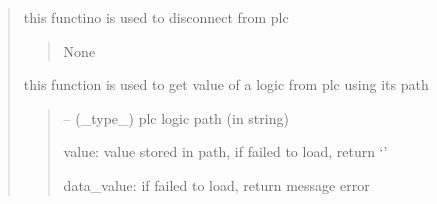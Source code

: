 \documentclass[letterpaper,10pt,english]{sphinxmanual}
\begin{document}
\begin{quote}
\begin{savenotes}
\begin{fulllineitems}
\begin{savenotes}
\begin{fulllineitems}
\begin{quote}
\begin{description}
\end{description}\end{quote}

\end{fulllineitems}\end{savenotes}


\begin{savenotes}\begin{fulllineitems}
\label{\detokenize{setting/backend/plc_managment:oxin.backend.plc_managment.management.disconnect}}
\pysigstartsignatures
{}
\pysigstopsignatures
\sphinxAtStartPar
this functino is used to disconnect from plc
\begin{quote}\begin{description}
\sphinxAtStartPar
None

\end{description}\end{quote}

\end{fulllineitems}\end{savenotes}


\begin{savenotes}\begin{fulllineitems}
\label{\detokenize{setting/backend/plc_managment:oxin.backend.plc_managment.management.get_value}}
\pysigstartsignatures
{}
\pysigstopsignatures
\sphinxAtStartPar
this function is used to get value of a logic from plc using its path
\begin{quote}\begin{description}
\sphinxAtStartPar
{} – (\_type\_) plc logic path (in string)

\sphinxAtStartPar
value: value stored in path, if failed to load, return ‘\sphinxhyphen{}’

\sphinxAtStartPar
data\_value: if failed to load, return message error


\end{description}
\end{quote}
\end{fulllineitems}
\end{savenotes}
\end{fulllineitems}
\end{savenotes}
\end{quote}
\end{document}
